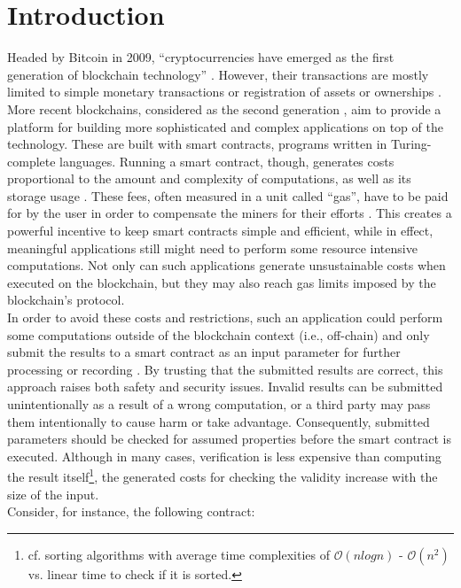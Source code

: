 \chapter{Introduction}\label{chap:introduction}
Headed by Bitcoin in 2009, ``cryptocurrencies have emerged as the first generation of blockchain technology'' \cite{alharby_blockchain_2017}. However, their transactions are mostly limited to simple monetary transactions or registration of assets or ownerships \cite{alharby_blockchain_2017}. More recent blockchains, considered as the second generation \cite{alharby_blockchain_2017}, aim to provide a platform for building more sophisticated and complex applications on top of the technology. These are built with smart contracts, programs written in Turing-complete languages. Running a smart contract, though, generates costs proportional to the amount and complexity of computations, as well as its storage usage \cite{chen_under-alharby_blockchain_2017}. These fees, often measured in a unit called ``gas'', have to be paid for by the user in order to compensate the miners for their efforts \cite{chen_under-optimized_2020}. This creates a powerful incentive to keep smart contracts simple and efficient, while in effect, meaningful applications still might need to perform some resource intensive computations. Not only can such applications generate unsustainable costs when executed on the blockchain, but they may also reach gas limits imposed by the blockchain's protocol. \\
In order to avoid these costs and restrictions, such an application could perform some computations outside of the blockchain context (i.e., off-chain) and only submit the results to a smart contract as an input parameter for further processing or recording \cite{thiemann_2020}. By trusting that the submitted results are correct, this approach raises both safety and security issues. Invalid results can be submitted unintentionally as a result of a wrong computation, or a third party may pass them intentionally to cause harm or take advantage. Consequently, submitted parameters should be checked for assumed properties before the smart contract is executed. Although in many cases, verification is less expensive than computing the result itself\footnote{cf. sorting algorithms with average time complexities of $\mathcal{O}(n log n)$ - $\mathcal{O}(n^2)$ \cite{review_sorting} vs. linear time to check if it is sorted.}, the generated costs for checking the validity increase with the size of the input. \\
Consider, for instance, the following contract:
